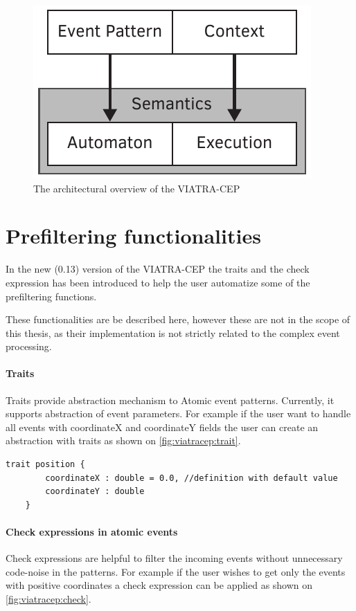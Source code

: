 \begin{figure}[h]
	\centering
	\includegraphics[width=0.4\linewidth]{figures/chapter_3/oldcep}
	\caption{The architectural overview of the VIATRA-CEP \redraw}
	\label{fig:viatracep:oldcep}
\end{figure}

\section{Prefiltering functionalities}
In the new (0.13) version of the VIATRA-CEP the traits and the check expression has been introduced to help the user automatize some of the prefiltering functions.

These functionalities are be described here, however these are not in the scope of this thesis, as their implementation is not strictly related to the complex event processing.

\paragraph{Traits}
Traits provide abstraction mechanism to Atomic event patterns. Currently, it supports abstraction of event parameters. For example if the user want to handle all events with coordinateX and coordinateY fields the user can create an abstraction with traits as shown on \cref{fig:viatracep:trait}.


\begin{lstlisting}[caption={Example of the traits in VIATRA-CEP},label={fig:viatracep:trait}]
	trait position {
		coordinateX : double = 0.0, //definition with default value
		coordinateY : double
	}
\end{lstlisting}


\paragraph{Check expressions in atomic events}

Check expressions are helpful to filter the incoming events without unnecessary code-noise in the patterns. For example if the user wishes to get only the events with positive coordinates a check expression can be applied as shown on \cref{fig:viatracep:check}.


